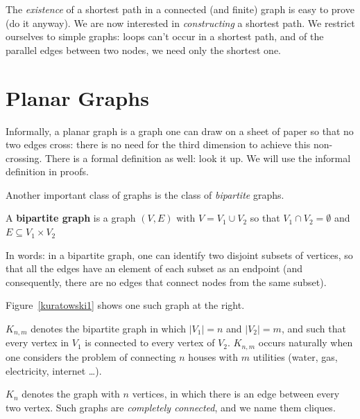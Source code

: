 The {\em existence} of a shortest path in a connected (and finite)
graph is easy to prove (do it anyway). We are now interested in {\em
constructing} a shortest path. We restrict ourselves to simple graphs:
loops can't occur in a shortest path, and of the parallel edges
between two nodes, we need only the shortest one.



\section{Planar Graphs}

Informally, a planar graph is a graph one can draw on a sheet of
paper so that no two edges cross: there is no need for the third
dimension to achieve this non-crossing. There is a formal definition
as well: look it up. We will use the informal definition in proofs.

Another important class of graphs is the class of {\em bipartite}
graphs.

 \begin{definition}
  \textup{A \textbf{bipartite graph} is a graph $(V,E)$ with $V =
V_{1} \cup V_{2}$ so that $V_{1} \cap V_{2} = \emptyset$ and $E
\subseteq V_{1} \times V_{2}$ }
\end{definition}

In words: in a bipartite graph, one can identify two disjoint subsets
of vertices, so that all the edges have an element of each subset as
an endpoint (and consequently, there are no edges that connect nodes
from the same subset).

Figure~\ref{kuratowski1} shows one such graph at the right.

$K_{n,m}$ denotes the bipartite graph in which $|V_{1}| = n$ and
$|V_{2}| = m$, and such that every vertex in $V_{1}$ is connected to
every vertex of $V_{2}$. $K_{n,m}$ occurs naturally when one considers
the problem of connecting $n$ houses with $m$ utilities (water, gas,
electricity, internet \ldots).

$K_{n}$ denotes the graph with $n$ vertices, in which there is an edge
between every two vertex. Such graphs are {\em completely
connected}, and we name them cliques.

